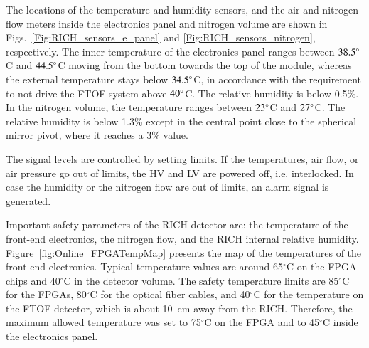 \documentclass[5p,times,twocolumn]{elsarticle}
\begin{document}
The locations of the temperature and humidity sensors, and the air and nitrogen flow meters inside the electronics
panel and nitrogen volume are shown in Figs.~\ref{Fig:RICH_sensors_e_panel} and \ref{Fig:RICH_sensors_nitrogen},
respectively. The inner temperature of the electronics panel ranges between $\rm 38.5^\circ$C and $\rm 44.5^\circ$C
moving from the bottom towards the top of the module, whereas the external temperature stays below $\rm 34.5^\circ$C,
in accordance with the requirement to not drive the FTOF system above $\rm 40^\circ$C. The relative humidity is below
0.5\%. In the nitrogen volume, the temperature ranges between $\rm 23^\circ$C and $\rm 27^\circ$C. The relative
humidity is below 1.3\% except in the central point close to the spherical mirror pivot, where it reaches a 3\% value.

The signal levels are controlled by setting limits.  If the temperatures, air flow, or air pressure go out of limits, the
HV and LV are powered off, i.e. interlocked. In case the humidity or the nitrogen flow are out of limits, an alarm signal
is generated.

Important safety parameters of the RICH detector are: the temperature of the front-end electronics, the nitrogen
flow, and the RICH internal relative humidity. Figure~\ref{fig:Online_FPGATempMap} presents the map of the
temperatures of the front-end electronics.
Typical temperature values are around 65$^\circ$C on the FPGA chips and 40$^\circ$C in the detector volume.
The safety temperature limits are 85$^\circ$C for the FPGAs, 80$^\circ$C for the optical fiber cables, and 40$^\circ$C
for the temperature on the FTOF detector, which is about 10~cm away from the RICH. Therefore, the maximum
allowed temperature was set to 75$^\circ$C on the FPGA and to 45$^\circ$C inside the electronics panel.

\end{document}
